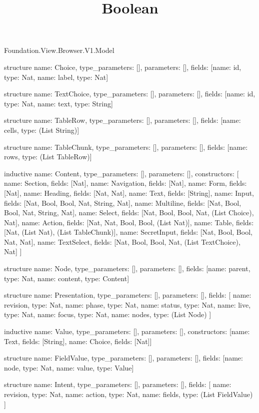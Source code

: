 \begin{lexlean}{Foundation.View.Browser.V1.Model}
\title{Boolean}
\begin{semanticmodule}
structure{
  name: Choice,
  type_parameters: [],
  parameters: [],
  fields: [{name: id, type: Nat}, {name: label, type: Nat}]
}

structure{
  name: TextChoice,
  type_parameters: [],
  parameters: [],
  fields: [{name: id, type: Nat}, {name: text, type: String}]
}

structure{
  name: TableRow,
  type_parameters: [],
  parameters: [],
  fields: [{name: cells, type: (List String)}]
}

structure{
  name: TableChunk,
  type_parameters: [],
  parameters: [],
  fields: [{name: rows, type: (List TableRow)}]
}

inductive{
  name: Content,
  type_parameters: [],
  parameters: [],
  constructors: [
    {name: Section, fields: [Nat]},
    {name: Navigation, fields: [Nat]},
    {name: Form, fields: [Nat]},
    {name: Heading, fields: [Nat, Nat]},
    {name: Text, fields: [String]},
    {name: Input, fields: [Nat, Bool, Bool, Nat, String, Nat]},
    {name: Multiline, fields: [Nat, Bool, Bool, Nat, String, Nat]},
    {name: Select, fields: [Nat, Bool, Bool, Nat, (List Choice), Nat]},
    {name: Action, fields: [Nat, Nat, Bool, Bool, (List Nat)]},
    {name: Table, fields: [Nat, (List Nat), (List TableChunk)]},
    {name: SecretInput, fields: [Nat, Bool, Bool, Nat, Nat]},
    {name: TextSelect, fields: [Nat, Bool, Bool, Nat, (List TextChoice), Nat]}
  ]
}

structure{
  name: Node,
  type_parameters: [],
  parameters: [],
  fields: [{name: parent, type: Nat}, {name: content, type: Content}]
}

structure{
  name: Presentation,
  type_parameters: [],
  parameters: [],
  fields: [
    {name: revision, type: Nat},
    {name: phase, type: Nat},
    {name: status, type: Nat},
    {name: live, type: Nat},
    {name: focus, type: Nat},
    {name: nodes, type: (List Node)}
  ]
}

inductive{
  name: Value,
  type_parameters: [],
  parameters: [],
  constructors: [{name: Text, fields: [String]}, {name: Choice, fields: [Nat]}]
}

structure{
  name: FieldValue,
  type_parameters: [],
  parameters: [],
  fields: [{name: node, type: Nat}, {name: value, type: Value}]
}

structure{
  name: Intent,
  type_parameters: [],
  parameters: [],
  fields: [
    {name: revision, type: Nat},
    {name: action, type: Nat},
    {name: fields, type: (List FieldValue)}
  ]
}


\end{semanticmodule}
\end{lexlean}
